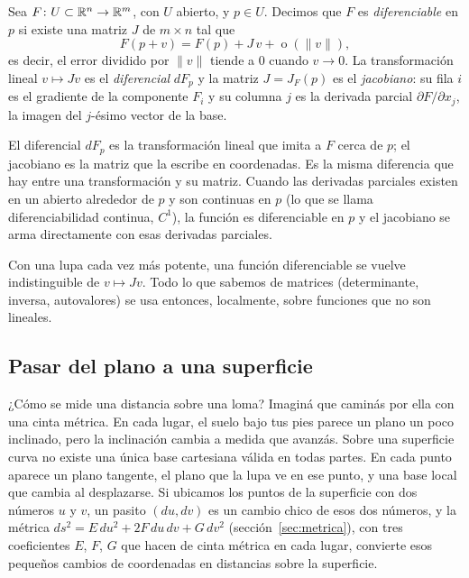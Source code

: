 \begin{definicion}\label{def:jacobiano}
Sea \(F\colon U\subset\mathbb{R}^n\to\mathbb{R}^m\), con \(U\) abierto, y \(p\in U\). Decimos que \(F\) es
\emph{diferenciable} en \(p\) si existe una matriz \(J\) de \(m\times n\) tal que
\[
  F(p+v)=F(p)+J\,v+\operatorname{o}(\lVert v\rVert),
\]
es decir, el error dividido por \(\lVert v\rVert\) tiende a \(0\) cuando \(v\to0\). La
transformación lineal \(v\mapsto Jv\) es el \emph{diferencial} \(dF_p\) y la matriz \(J=J_F(p)\)
es el \emph{jacobiano}: su fila \(i\) es el gradiente de la componente \(F_i\) y su columna
\(j\) es la derivada parcial \(\partial F/\partial x_j\), la imagen del \(j\)-ésimo vector de la
base.
\end{definicion}

El diferencial \(dF_p\) es la transformación lineal que imita a \(F\) cerca de \(p\); el
jacobiano es la matriz que la escribe en coordenadas. Es la misma diferencia que hay entre una
transformación y su matriz. Cuando las derivadas parciales existen en un abierto alrededor de \(p\) y son continuas en \(p\) (lo que se llama diferenciabilidad continua, \(C^1\)), la función es diferenciable en \(p\) y el jacobiano se arma directamente con esas derivadas parciales.

\begin{idea}
Con una lupa cada vez más potente, una función diferenciable se vuelve indistinguible de
\(v\mapsto Jv\). Todo lo que sabemos de matrices (determinante, inversa, autovalores) se usa
entonces, localmente, sobre funciones que no son lineales.
\end{idea}


\subsection{Pasar del plano a una superficie}\label{sec:plano-superficie}

¿Cómo se mide una distancia sobre una loma? Imaginá que caminás por ella con una cinta
métrica. En cada lugar, el suelo bajo tus pies parece un plano un poco inclinado, pero la
inclinación cambia a medida que avanzás. Sobre una superficie curva no existe una única base
cartesiana válida en todas partes. En cada punto aparece un plano tangente, el plano que la
lupa ve en ese punto, y una base local que cambia al desplazarse. Si ubicamos los puntos de la
superficie con dos números \(u\) y \(v\), un pasito \((du,dv)\) es un cambio chico de esos dos
números, y la métrica \(ds^2=E\,du^2+2F\,du\,dv+G\,dv^2\) (sección~\ref{sec:metrica}), con tres
coeficientes \(E\), \(F\), \(G\) que hacen de cinta métrica en cada lugar, convierte esos
pequeños cambios de coordenadas en distancias sobre la superficie.

